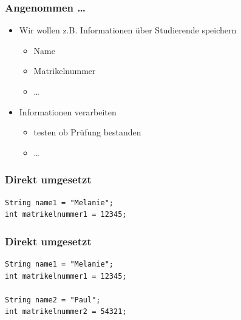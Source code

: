 \documentclass{../../presentation}
\begin{document}
\begin{frame}
	\frametitle{Angenommen \dots}
	\begin{itemize}
		\item\pause Wir wollen z.B. Informationen über Studierende speichern
		      \begin{itemize}
			      \item<2->[\textbullet] Name
			      \item<3->[\textbullet] Matrikelnummer
			      \item<4->[\textbullet] \dots
		      \end{itemize}
		\item<5-> Informationen verarbeiten
		      \begin{itemize}
			      \item<6->[\textbullet] testen ob Prüfung bestanden
			      \item<7->[\textbullet] \dots
		      \end{itemize}
	\end{itemize}
\end{frame}

\begin{frame}[fragile,t]
	\frametitle{Direkt umgesetzt}
	\vspace{2.0em}
	\begin{minipage}[t][0.6\textheight][t]{\textwidth}
		\begin{verbatim}
String name1 = "Melanie";
int matrikelnummer1 = 12345;
\end{verbatim}
	\end{minipage}
\end{frame}

\begin{frame}[fragile,t]
	\frametitle{Direkt umgesetzt}
	\vspace{2.0em}
	\begin{minipage}[t][0.6\textheight][t]{\textwidth}
		\begin{verbatim}
String name1 = "Melanie";
int matrikelnummer1 = 12345;

String name2 = "Paul";
int matrikelnummer2 = 54321;
\end{verbatim}
	\end{minipage}
\end{frame}
\end{document}
